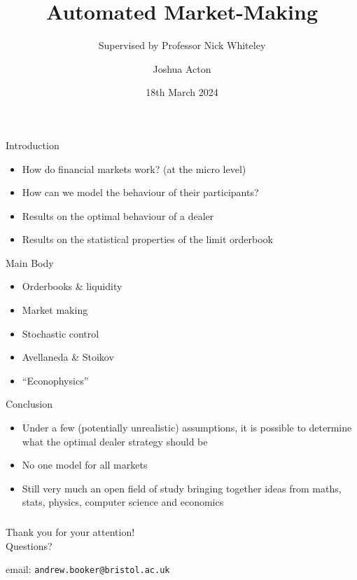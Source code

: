 \documentclass{beamer} %
\title{Automated Market-Making}
\author{Joshua Acton}
\date{18th March 2024}
\subtitle{Supervised by Professor Nick Whiteley}
\begin{document}
\begin{frame}
    \titlepage
\end{frame}

\begin{frame}{Introduction}
    \begin{itemize}
    \item How do financial markets work? (at the micro level)
    \item How can we model the behaviour of their participants?
    \item Results on the optimal behaviour of a dealer
    \item Results on the statistical properties of the limit orderbook
    \end{itemize}
\end{frame}

\begin{frame}{Main Body}
    \begin{itemize}
        \item Orderbooks \& liquidity
        \item Market making
        \item Stochastic control
        \item Avellaneda \& Stoikov
        \item ``Econophysics''
    \end{itemize}
\end{frame}

\begin{frame}{Conclusion}
    \begin{itemize}
        \item Under a few (potentially unrealistic) assumptions, it is
        possible to determine what the optimal dealer strategy should be
        \item No one model for all markets
        \item Still very much an open field of study bringing together ideas
        from maths, stats, physics, computer science and economics
    \end{itemize}
\end{frame}

\begin{frame}
    \frametitle{}
    \begin{center}
        \large{Thank you for your attention!}\\
        \vspace{1cm}
        Questions?
        \vspace{2cm}

        email: \texttt{andrew.booker@bristol.ac.uk}
    \end{center}
\end{frame}
\end{document}

